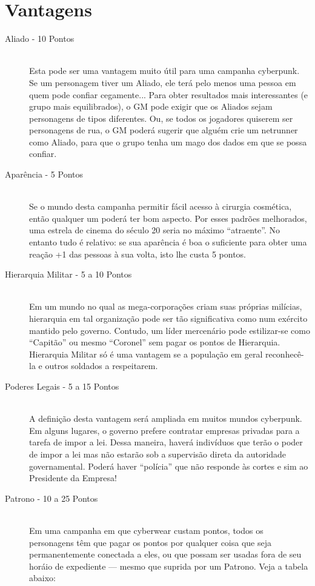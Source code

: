 \documentclass[a4paper]{article}
\begin{document}
\section{Vantagens}

\begin{description}
  \item[Aliado - 10 Pontos] \hfill \\ Esta pode ser uma vantagem muito útil para uma campanha cyberpunk. Se um personagem tiver um Aliado, ele terá pelo menos uma pessoa em quem pode confiar cegamente... Para obter resultados mais interessantes (e grupo mais equilibrados), o GM pode exigir que os Aliados sejam personagens de tipos diferentes. Ou, se todos os jogadores quiserem ser personagens de rua, o GM poderá sugerir que alguém crie um netrunner como Aliado, para que o grupo tenha um mago dos dados em que se possa confiar.
  \item[Aparência - 5 Pontos] \hfill \\ Se o mundo desta campanha permitir fácil acesso à cirurgia
cosmética, então qualquer um poderá ter bom aspecto. Por esses
padrões melhorados, uma estrela de cinema do século 20 seria
no máximo “atraente”. No entanto tudo é relativo: se sua
aparência é boa o suficiente para obter uma reação +1 das
pessoas à sua volta, isto lhe custa 5 pontos.
  \item[Hierarquia Militar - 5 a 10 Pontos] \hfill \\ Em um mundo no qual as mega-corporações criam suas próprias
milícias, hierarquia em tal organização pode ser tão significativa como
num exército mantido pelo governo. Contudo, um líder mercenário
pode estilizar-se como “Capitão” ou mesmo “Coronel” sem pagar os
pontos de Hierarquia. Hierarquia Militar só é uma vantagem se a
população em geral reconhecê-la e outros soldados a respeitarem.
  \item[Poderes Legais - 5 a 15 Pontos] \hfill \\ A definição desta vantagem será ampliada em muitos mundos
cyberpunk. Em alguns lugares, o governo prefere contratar
empresas privadas para a tarefa de impor a lei. Dessa maneira,
haverá indivíduos que terão o poder de impor a lei mas não
estarão sob a supervisão direta da autoridade governamental.
Poderá haver “polícia” que não responde às cortes e sim ao
Presidente da Empresa!
  \item[Patrono - 10 a 25 Pontos] \hfill \\ Em uma campanha em que cyberwear custam pontos, todos os
personagens têm que pagar os pontos por qualquer coisa que seja
permanentemente conectada a eles, ou que possam ser usadas fora de
seu horáio de expediente — mesmo que suprida por um Patrono. Veja a tabela abaixo:


\end{description}
\end{document}
